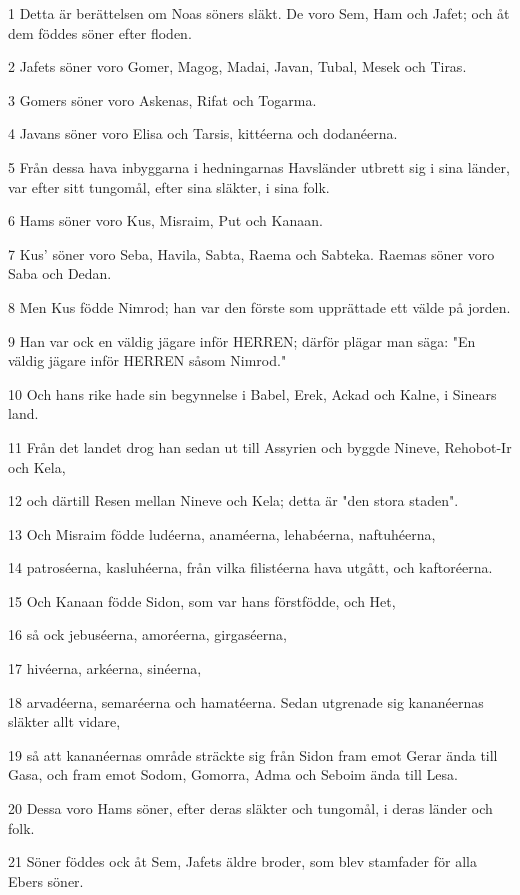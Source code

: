 \par 1 Detta är berättelsen om Noas söners släkt. De voro Sem, Ham och Jafet; och åt dem föddes söner efter floden.
\par 2 Jafets söner voro Gomer, Magog, Madai, Javan, Tubal, Mesek och Tiras.
\par 3 Gomers söner voro Askenas, Rifat och Togarma.
\par 4 Javans söner voro Elisa och Tarsis, kittéerna och dodanéerna.
\par 5 Från dessa hava inbyggarna i hedningarnas Havsländer utbrett sig i sina länder, var efter sitt tungomål, efter sina släkter, i sina folk.
\par 6 Hams söner voro Kus, Misraim, Put och Kanaan.
\par 7 Kus' söner voro Seba, Havila, Sabta, Raema och Sabteka. Raemas söner voro Saba och Dedan.
\par 8 Men Kus födde Nimrod; han var den förste som upprättade ett välde på jorden.
\par 9 Han var ock en väldig jägare inför HERREN; därför plägar man säga: "En väldig jägare inför HERREN såsom Nimrod."
\par 10 Och hans rike hade sin begynnelse i Babel, Erek, Ackad och Kalne, i Sinears land.
\par 11 Från det landet drog han sedan ut till Assyrien och byggde Nineve, Rehobot-Ir och Kela,
\par 12 och därtill Resen mellan Nineve och Kela; detta är "den stora staden".
\par 13 Och Misraim födde ludéerna, anaméerna, lehabéerna, naftuhéerna,
\par 14 patroséerna, kasluhéerna, från vilka filistéerna hava utgått, och kaftoréerna.
\par 15 Och Kanaan födde Sidon, som var hans förstfödde, och Het,
\par 16 så ock jebuséerna, amoréerna, girgaséerna,
\par 17 hivéerna, arkéerna, sinéerna,
\par 18 arvadéerna, semaréerna och hamatéerna. Sedan utgrenade sig kananéernas släkter allt vidare,
\par 19 så att kananéernas område sträckte sig från Sidon fram emot Gerar ända till Gasa, och fram emot Sodom, Gomorra, Adma och Seboim ända till Lesa.
\par 20 Dessa voro Hams söner, efter deras släkter och tungomål, i deras länder och folk.
\par 21 Söner föddes ock åt Sem, Jafets äldre broder, som blev stamfader för alla Ebers söner.
